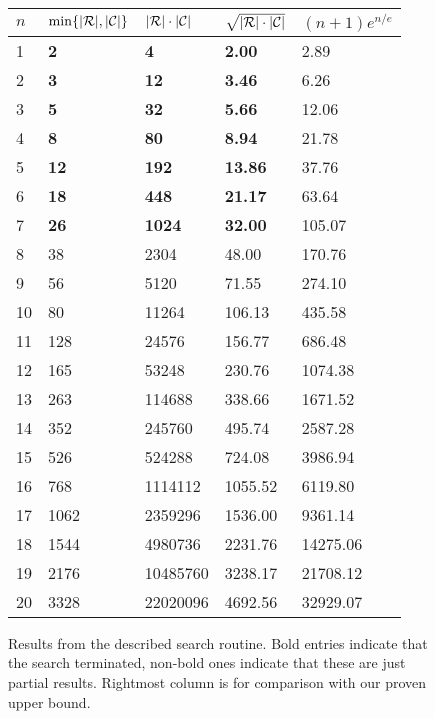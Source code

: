 \documentclass{report}
\DeclarePairedDelimiter{\set}{\{}{\}}
\DeclarePairedDelimiter{\abs}{\lvert}{\rvert}
\theoremstyle{definition}
\begin{document}
\begin{figure}[h]
\centering
\begin{tabular}{ | m{1.5em} || m{6em} | m{6em} | m{6em} | m{6em} | }
\hline
$n$ & $\min\set{\abs{\mathcal{R}}, \abs{\mathcal{C}}}$
& $\abs{\mathcal{R}} \cdot \abs{\mathcal{C}}$
& $\sqrt{\abs{\mathcal{R}} \cdot \abs{\mathcal{C}}}$
& $(n + 1) e^{n / e}$ \\
\hline \hline
1 & \textbf{2} & \textbf{4} & \textbf{2.00} & 2.89 \\
\hline
2 & \textbf{3} & \textbf{12} & \textbf{3.46} & 6.26 \\
\hline
3 & \textbf{5} & \textbf{32} & \textbf{5.66} & 12.06 \\
\hline
4 & \textbf{8} & \textbf{80} & \textbf{8.94} & 21.78 \\
\hline
5 & \textbf{12} & \textbf{192} & \textbf{13.86} & 37.76 \\
\hline
6 & \textbf{18} & \textbf{448} & \textbf{21.17} & 63.64 \\
\hline
7 & \textbf{26} & \textbf{1024} & \textbf{32.00} & 105.07 \\
\hline
8 & 38 & 2304 & 48.00 & 170.76 \\
\hline
9 & 56 & 5120 & 71.55 & 274.10 \\
\hline
10 & 80 & 11264 & 106.13 & 435.58 \\
\hline
11 & 128 & 24576 & 156.77 & 686.48 \\
\hline
12 & 165 & 53248 & 230.76 & 1074.38 \\
\hline
13 & 263 & 114688 & 338.66 & 1671.52 \\
\hline
14 & 352 & 245760 & 495.74 & 2587.28 \\
\hline
15 & 526 & 524288 & 724.08 & 3986.94 \\
\hline
16 & 768 & 1114112 & 1055.52 & 6119.80 \\
\hline
17 & 1062 & 2359296 & 1536.00 & 9361.14 \\
\hline
18 & 1544 & 4980736 & 2231.76 & 14275.06 \\
\hline
19 & 2176 & 10485760 & 3238.17 & 21708.12 \\
\hline
20 & 3328 & 22020096 & 4692.56 & 32929.07 \\
\hline
\end{tabular}
\caption[Results from the brute-force search routine]
{Results from the described search routine. Bold entries indicate that the
search terminated, non-bold ones indicate that these are just partial results.
Rightmost column is for comparison with our proven upper bound.}
\label{fig.results}
\end{figure}
\end{document}
